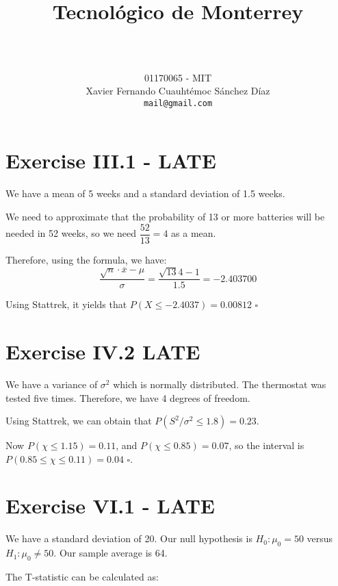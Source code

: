 \documentclass[titlepage, letterpaper]{article}
\title{
\vspace{1in}
\textbf{Tecnológico de Monterrey} \\
\vspace{0.5in}
\textmd{\mahclass} \\
\vspace{0.5in}
\textsc{\mahtitle}
\author{01170065  - MIT \\
Xavier Fernando Cuauhtémoc Sánchez Díaz \\
\texttt{mail@gmail.com}}
\date{\mahdate}
}
\newcommand{\qed}{\,\,\square}
\begin{document}
\begin{titlepage}
    \maketitle
\end{titlepage}

%
%

\section{Exercise III.1 - LATE} %
\label{sec:exercise_iii_1}
We have a mean of 5 weeks and a standard deviation of 1.5 weeks.

We need to approximate that the probability of 13 or more batteries will be needed in 52 weeks, so we need $\dfrac{52}{13} = 4$ as a mean.

Therefore, using the formula, we have:
$$\dfrac{\sqrt{n} \cdot \overline{x} - \mu}{\sigma} = \dfrac{\sqrt{13} 4 - 1}{1.5} = -2.403700$$

Using Stattrek, it yields that $P(X \leq -2.4037) = 0.00812 \qed$


\section{Exercise IV.2 LATE} %
\label{sec:exercise_iv_2}


We have a variance of $\sigma^2$ which is normally distributed.
The thermostat was tested five times.
Therefore, we have 4 degrees of freedom.

Using Stattrek, we can obtain that $P(S^2/\sigma^2 \leq 1.8) = 0.23$.

Now $P(\chi \leq 1.15) = 0.11$, and $P(\chi \leq 0.85) = 0.07$, so the interval is $P(0.85 \leq \chi \leq 0.11) = 0.04\qed$.

\section{Exercise VI.1 - LATE} %
\label{sec:exercise_vi_1}

We have a standard deviation of 20.
Our null hypothesis is $H_0 \colon \mu_0 = 50$ versus $H_1 \colon \mu_0 \not = 50$.
Our sample average is 64.

The T-statistic can be calculated as:
\end{document}
